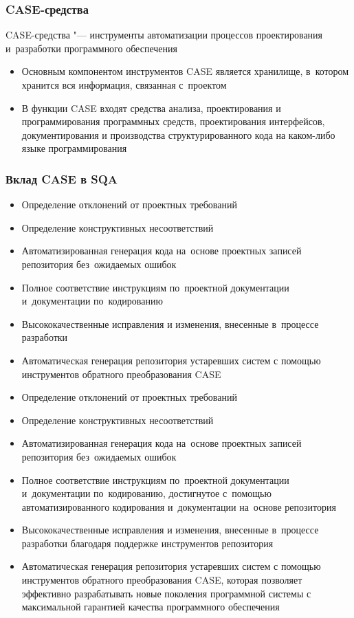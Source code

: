 \documentclass{../industrial-development}
\begin{document}
\begin{frame} \frametitle{CASE-средства}
	\begin{block}{}
	\alert{CASE-средства} "--- инструменты автоматизации процессов проектирования и~разработки программного обеспечения
	\end{block}
 	 \begin{itemize}
\item Основным компонентом инструментов CASE является хранилище, в~котором хранится вся информация, связанная с~проектом 
\item В функции CASE входят средства анализа, проектирования и программирования программных средств, проектирования интерфейсов, документирования и производства структурированного кода на каком-либо языке программирования
  	\end{itemize}
\end{frame}



\begin{frame} \frametitle{Вклад CASE в SQA}
 	 \begin{itemize}
\item Определение отклонений от проектных требований
\item Определение конструктивных несоответствий
\item Автоматизированная генерация кода на~основе проектных записей репозитория без~ожидаемых ошибок
\item Полное соответствие инструкциям по~проектной документации и~документации по~кодированию
\item Высококачественные исправления и изменения, внесенные в~процессе разработки
\item Автоматическая генерация репозитория устаревших систем с помощью инструментов обратного преобразования CASE 
  	\end{itemize}
\end{frame}

\lecturenotes

 	 \begin{itemize}
\item Определение отклонений от проектных требований
\item Определение конструктивных несоответствий
\item Автоматизированная генерация кода на~основе проектных записей репозитория без~ожидаемых ошибок
\item Полное соответствие инструкциям по~проектной документации и~документации по~кодированию, достигнутое с~помощью автоматизированного кодирования и~документации на~основе репозитория
\item Высококачественные исправления и изменения, внесенные в~процессе разработки благодаря поддержке инструментов репозитория
\item Автоматическая генерация репозитория устаревших систем с помощью инструментов обратного преобразования CASE, которая позволяет эффективно разрабатывать новые поколения программной системы с максимальной гарантией качества программного обеспечения~\cite[с.~302]{SQA-Galin}
  	\end{itemize}
\end{document}

